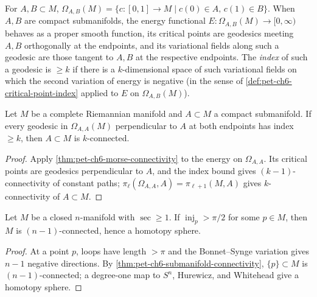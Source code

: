 \begin{definition}
  \label{def:pet-ch6-path-space-AB}


  For $A,B\subset M$, $\Omega_{A,B}(M)=\{c:[0,1]\to M\mid c(0)\in A,\,c(1)\in
  B\}$. When $A,B$ are compact submanifolds, the energy functional
  $E:\Omega_{A,B}(M)\to[0,\infty)$ behaves as a proper smooth function, its
  critical points are geodesics meeting $A,B$ orthogonally at the endpoints,
  and its variational fields along such a geodesic are those tangent to $A,B$
  at the respective endpoints. The \emph{index} of such a geodesic is $\ge k$
  if there is a $k$-dimensional space of such variational fields on which the
  second variation of energy is negative (in the sense of
  \cref{def:pet-ch6-critical-point-index} applied to $E$ on
  $\Omega_{A,B}(M)$).
\end{definition}

\begin{theorem}
  \label{thm:pet-ch6-submanifold-connectivity}


  Let $M$ be a complete Riemannian manifold and $A\subset M$ a compact
  submanifold. If every geodesic in $\Omega_{A,A}(M)$ perpendicular to $A$ at
  both endpoints has index $\ge k$, then $A\subset M$ is $k$-connected.
\end{theorem}
\begin{proof}
  \sketch
  Apply \cref{thm:pet-ch6-morse-connectivity} to the energy on \(\Omega_{A,A}\). Its critical points are geodesics perpendicular to \(A\), and the index bound gives \((k-1)\)-connectivity of constant paths; \(\pi_\ell(\Omega_{A,A},A)=\pi_{\ell+1}(M,A)\) gives \(k\)-connectivity of \(A\subset M\).
\end{proof}

\begin{theorem}
  \label{thm:pet-ch6-berger-sphere-theorem}


  Let $M$ be a closed $n$-manifold with $\sec\ge1$. If $\operatorname{inj}_p>\pi/2$ for
  some $p\in M$, then $M$ is $(n-1)$-connected, hence a homotopy sphere.
\end{theorem}
\begin{proof}
  \sketch
  At a point \(p\), loops have length \(>\pi\) and the Bonnet--Synge variation gives \(n-1\) negative directions. By \cref{thm:pet-ch6-submanifold-connectivity}, \(\{p\}\subset M\) is \((n-1)\)-connected; a degree-one map to \(S^n\), Hurewicz, and Whitehead give a homotopy sphere.
\end{proof}

